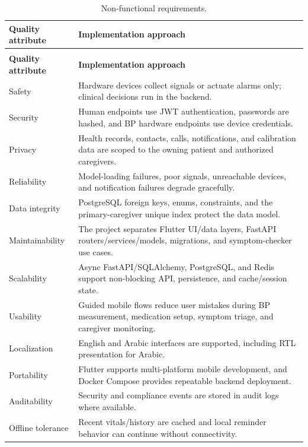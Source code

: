 \documentclass[12pt,a4paper]{report}
\begin{document}
\begingroup
\small
\setlength{\LTpre}{0.3em}
\setlength{\LTpost}{0.3em}
\begin{longtable}{@{}>{\raggedright\arraybackslash}p{4.4cm}>{\raggedright\arraybackslash}p{10.0cm}@{}}
\caption{Non-functional requirements.}\label{tab:nonfunctional-reqs}\\
\toprule
\textbf{Quality attribute} & \textbf{Implementation approach} \\
\midrule
\endfirsthead
\multicolumn{2}{c}{\small\itshape Table~\ref{tab:nonfunctional-reqs} continued}\\
\toprule
\textbf{Quality attribute} & \textbf{Implementation approach} \\
\midrule
\endhead
\bottomrule
\endfoot
Safety & Hardware devices collect signals or actuate alarms only; clinical decisions run in the backend. \\
Security & Human endpoints use JWT authentication, passwords are hashed, and BP hardware endpoints use device credentials. \\
Privacy & Health records, contacts, calls, notifications, and calibration data are scoped to the owning patient and authorized caregivers. \\
Reliability & Model-loading failures, poor signals, unreachable devices, and notification failures degrade gracefully. \\
Data integrity & PostgreSQL foreign keys, enums, constraints, and the primary-caregiver unique index protect the data model. \\
Maintainability & The project separates Flutter UI/data layers, FastAPI routers/services/models, migrations, and symptom-checker use cases. \\
Scalability & Async FastAPI/SQLAlchemy, PostgreSQL, and Redis support non-blocking API, persistence, and cache/session state. \\
Usability & Guided mobile flows reduce user mistakes during BP measurement, medication setup, symptom triage, and caregiver monitoring. \\
Localization & English and Arabic interfaces are supported, including RTL presentation for Arabic. \\
Portability & Flutter supports multi-platform mobile development, and Docker Compose provides repeatable backend deployment. \\
Auditability & Security and compliance events are stored in audit logs where available. \\
Offline tolerance & Recent vitals/history are cached and local reminder behavior can continue without connectivity. \\
\end{longtable}
\endgroup
\end{document}
